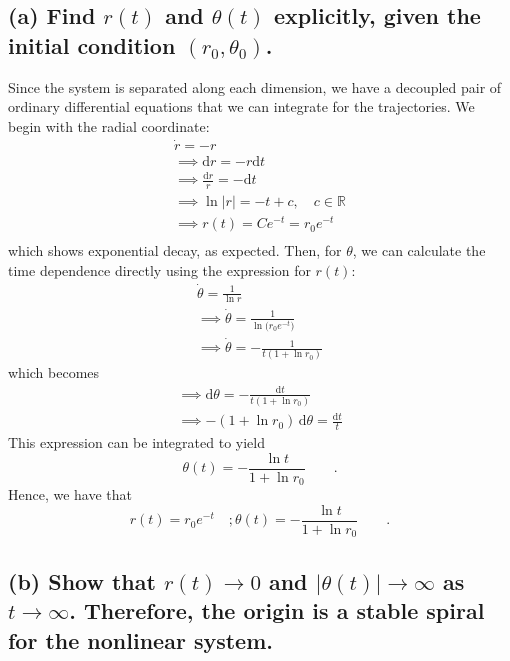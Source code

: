 \documentclass[draft]{agujournal2019}
\begin{document}
\subsection{(a) Find $r(t)$ and $\theta(t)$ explicitly, given the initial condition $(r_0,\theta_0)$.}
\label{ssec:p6a}

Since the system is separated along each dimension, we have a decoupled pair of ordinary differential equations that we can integrate for the trajectories. We begin with the radial coordinate:
\begin{align*}
    \dot r = -r \\
    \implies \mathrm{d}r = -r\mathrm{d}t\\
    \implies \frac{\mathrm{d}r}{r} = - \mathrm{d}t\\
    \implies \ln{|r|} = -t + c,\quad c\in\mathbb{R}\\
    \implies r(t) = Ce^{-t} = r_0 e^{-t}\\
\end{align*}
which shows exponential decay, as expected. Then, for $\theta$, we can calculate the time dependence directly using the expression for $r(t)$:
\begin{align*}
    \dot \theta = \frac{1}{\ln{r}} \\
   \implies  \dot \theta = \frac{1}{\ln{(r_0e^{-t}})} \\
    \implies  \dot \theta= -\frac{1}{t(1+\ln{r_0})}
\end{align*}
which becomes 
\begin{align*}
        \implies \mathrm{d}\theta = - \frac{\mathrm{d}t}{t(1+\ln{r_0})}\\
    \implies -(1+\ln{r_0})\,\mathrm{d}\theta = \frac{\mathrm{d}t}{t}
\end{align*}
This expression can be integrated to yield
\begin{equation*}
    \theta (t) = -\frac{\ln{t}}{1 + \ln{r_0}} \qquad .
\end{equation*}
Hence, we have that 
\begin{equation}
    r(t) = r_0 e^{-t} \quad ; \theta (t) = -\frac{\ln{t}}{1 + \ln{r_0}} \qquad .
\end{equation}


\subsection{(b) Show that $r(t)\longrightarrow 0$ and $|\theta(t)|\longrightarrow\infty$ as $t\longrightarrow\infty$. Therefore, the origin is a stable spiral for the nonlinear system.}
\label{ssec:p6b}
\end{document}
